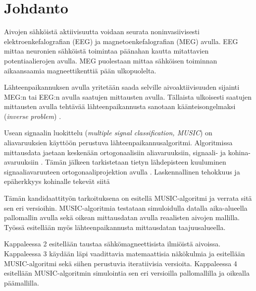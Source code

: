 \section{Johdanto}

Aivojen sähköistä aktiivisuutta voidaan seurata noninvasiivisesti elektroenkefalografian (EEG) ja magnetoenkefalografian (MEG) avulla. EEG mittaa neuronien sähköistä toimintaa päänahan kautta mitattavien potentiaalierojen avulla. MEG puolestaan mittaa sähköisen toiminnan aikaansaamia magneettikenttiä pään ulkopuolelta. \citep{Hamalainen1993MagnetoencephalographytheoryBrain}

Lähteenpaikannuksen avulla yritetään saada selville aivoaktiivisuuden sijainti MEG:n tai EEG:n avulla saatujen mittausten avulla. Tällaista ulkoisesti saatujen mittausten avulla tehtävää lähteenpaikannusta sanotaan käänteisongelmaksi (\textit{inverse problem}) \citep[s. 2]{hansen2010meg}.

Usean signaalin luokittelu (\textit{multiple signal classification, MUSIC}) \citep{Schmidt1986MultipleEstimation} on aliavaruuksien käyttöön perustuva lähteenpaikannusalgoritmi. Algoritmissa mittausdata jaetaan keskenään ortogonaalisiin aliavaruuksiin, signaali- ja kohina-avaruuksiin \citep{Schmidt1986MultipleEstimation, Mosher1999SourceMUSIC}. Tämän jälkeen tarkistetaan tietyn lähdepisteen kuuluminen signaaliavaruuteen ortogonaaliprojektion avulla \citep{Mosher1999SourceMUSIC}. Laskennallinen tehokkuus ja epäherkkyys kohinalle tekevät siitä 

Tämän kandidaattityön tarkoituksena on esitellä MUSIC-algoritmi ja verrata sitä sen eri versioihin. MUSIC-algoritmia testataan simuloidulla datalla aika-alueella pallomallin avulla sekä oikean mittausdatan avulla reaalisten aivojen mallilla. Työssä esitellään myös lähteenpaikannusta mittausdatan taajuusalueella.

Kappaleessa 2 esitellään taustaa sähkömagneettisista ilmiöistä aivoissa. Kappaleessa 3 käydään läpi vaadittavia matemaattisia näkökulmia ja esitellään MUSIC-algoritmi sekä siihen perustuvia iteratiivisia versioita. Kappaleessa 4 esitellään MUSIC-algoritmin simulointia sen eri versioilla pallomallilla ja oikealla päämallilla.